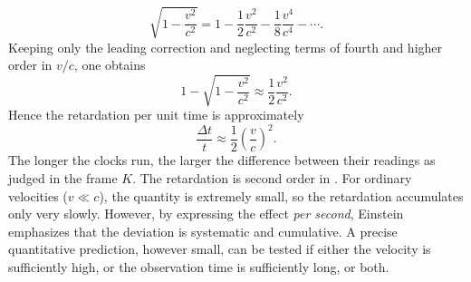 \documentclass[pdflatex,sn-basic]{sn-jnl}
\begin{document}
\begin{equation*}
\sqrt{1-\frac{v^{2}}{c^{2}}}
=
1-\frac{1}{2}\frac{v^{2}}{c^{2}}
-\frac{1}{8}\frac{v^{4}}{c^{4}}
-\cdots .
\end{equation*}
%
Keeping only the leading correction and neglecting terms of fourth and higher order in $v/c$, one obtains
\begin{equation*}
1-\sqrt{1-\frac{v^{2}}{c^{2}}}
\approx
\frac{1}{2}\frac{v^{2}}{c^{2}} .
\end{equation*}
%
Hence the retardation per unit time is approximately
%
\begin{equation*}
\frac{\Delta t}{t}
\approx
\frac{1}{2}\left(\frac{v}{c}\right)^{2}.
\end{equation*}
%
The longer the clocks run, the larger the difference between their readings as judged in the frame $K$. The retardation is second order in \betafactorh. For ordinary velocities ($v\ll c$), the quantity \betafactorsquaredh is extremely small, so the retardation accumulates only very slowly. However, by expressing the effect \emph{per second}, Einstein emphasizes that the deviation is systematic and cumulative. A precise quantitative prediction, however small, can be tested if either the velocity is sufficiently high, or the observation time is sufficiently long, or both.

\end{document}
